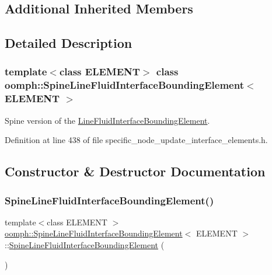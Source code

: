 \subsection*{Additional Inherited Members}


\subsection{Detailed Description}
\subsubsection*{template$<$class E\+L\+E\+M\+E\+NT$>$\newline
class oomph\+::\+Spine\+Line\+Fluid\+Interface\+Bounding\+Element$<$ E\+L\+E\+M\+E\+N\+T $>$}

Spine version of the \hyperlink{classoomph_1_1LineFluidInterfaceBoundingElement}{Line\+Fluid\+Interface\+Bounding\+Element}. 

Definition at line 438 of file specific\+\_\+node\+\_\+update\+\_\+interface\+\_\+elements.\+h.



\subsection{Constructor \& Destructor Documentation}
\mbox{\label{classoomph_1_1SpineLineFluidInterfaceBoundingElement_a27c79d149485d2269ed42136914635e1}} 
\subsubsection{\texorpdfstring{Spine\+Line\+Fluid\+Interface\+Bounding\+Element()}{SpineLineFluidInterfaceBoundingElement()}}
{\footnotesize\ttfamily template$<$class E\+L\+E\+M\+E\+NT $>$ \\
\hyperlink{classoomph_1_1SpineLineFluidInterfaceBoundingElement}{oomph\+::\+Spine\+Line\+Fluid\+Interface\+Bounding\+Element}$<$ E\+L\+E\+M\+E\+NT $>$\+::\hyperlink{classoomph_1_1SpineLineFluidInterfaceBoundingElement}{Spine\+Line\+Fluid\+Interface\+Bounding\+Element} (\begin{DoxyParamCaption}{ }\end{DoxyParamCaption})\hspace{0.3cm}{\ttfamily [inline]}}



